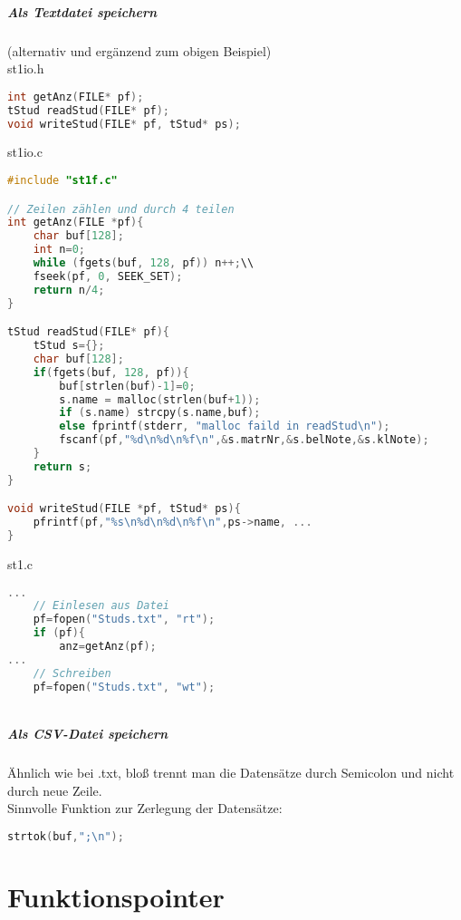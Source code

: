 \paragraph{Als Textdatei speichern} (alternativ und ergänzend zum obigen Beispiel)\\
st1io.h
\begin{lstlisting}[language=C]
int getAnz(FILE* pf);
tStud readStud(FILE* pf);
void writeStud(FILE* pf, tStud* ps);
\end{lstlisting}

st1io.c
\begin{lstlisting}[language=C]
#include "st1f.c"

// Zeilen zählen und durch 4 teilen
int getAnz(FILE *pf){
	char buf[128];
	int n=0;
	while (fgets(buf, 128, pf)) n++;\\
	fseek(pf, 0, SEEK_SET);
	return n/4;
}

tStud readStud(FILE* pf){
	tStud s={};
	char buf[128];
	if(fgets(buf, 128, pf)){
		buf[strlen(buf)-1]=0;
		s.name = malloc(strlen(buf+1));
		if (s.name) strcpy(s.name,buf);
		else fprintf(stderr, "malloc faild in readStud\n");
		fscanf(pf,"%d\n%d\n%f\n",&s.matrNr,&s.belNote,&s.klNote);
	}
	return s;
}

void writeStud(FILE *pf, tStud* ps){
	pfrintf(pf,"%s\n%d\n%d\n%f\n",ps->name, ...
}


\end{lstlisting}

st1.c
\begin{lstlisting}[language=C]
...
	// Einlesen aus Datei
	pf=fopen("Studs.txt", "rt");
	if (pf){
		anz=getAnz(pf);		
...
	// Schreiben
	pf=fopen("Studs.txt", "wt");
		
\end{lstlisting}

\paragraph{Als CSV-Datei speichern}

Ähnlich wie bei .txt, bloß trennt man die Datensätze durch Semicolon und nicht durch neue Zeile.\\
Sinnvolle Funktion zur Zerlegung der Datensätze: 
\begin{lstlisting}[language=C]
strtok(buf,";\n");
\end{lstlisting}

\chapter{Funktionspointer}


